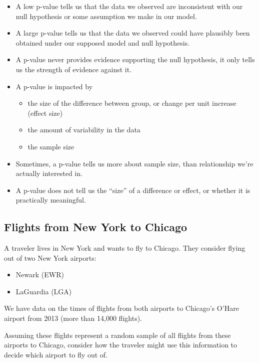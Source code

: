 \documentclass[
  letterpaper,
  DIV=11,
  numbers=noendperiod]{scrreprt}
\providecommand{\tightlist}{%
  \setlength{\itemsep}{0pt}\setlength{\parskip}{0pt}}\usepackage{longtable,booktabs,array}
\begin{document}
\begin{itemize}
\item
  A low p-value tells us that the data we observed are inconsistent with
  our null hypothesis or some assumption we make in our model.
\item
  A large p-value tells us that the data we observed could have
  plausibly been obtained under our supposed model and null hypothesis.
\item
  A p-value never provides evidence supporting the null hypothesis, it
  only tells us the strength of evidence against it.
\item
  A p-value is impacted by

  \begin{itemize}
  \tightlist
  \item
    the size of the difference between group, or change per unit
    increase (effect size)\\
  \item
    the amount of variability in the data\\
  \item
    the sample size
  \end{itemize}
\item
  Sometimes, a p-value tells us more about sample size, than
  relationship we're actually interested in.
\item
  A p-value does not tell us the ``size'' of a difference or effect, or
  whether it is practically meaningful.
\end{itemize}

\subsection{Flights from New York to
Chicago}\label{flights-from-new-york-to-chicago}

A traveler lives in New York and wants to fly to Chicago. They consider
flying out of two New York airports:

\begin{itemize}
\tightlist
\item
  Newark (EWR)\\
\item
  LaGuardia (LGA)
\end{itemize}

We have data on the times of flights from both airports to Chicago's
O'Hare airport from 2013 (more than 14,000 flights).

Assuming these flights represent a random sample of all flights from
these airports to Chicago, consider how the traveler might use this
information to decide which airport to fly out of.
\end{document}
